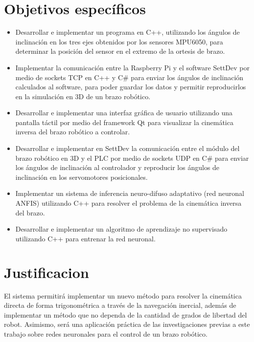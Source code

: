 \documentclass[12pt]{report}
\begin{document}
\section*{Objetivos específicos}
\begin{itemize}
	
\item Desarrollar e implementar un programa en C++, utilizando los ángulos de inclinación en los tres ejes obtenidos por los sensores MPU6050, para determinar la posición del sensor en el extremo de la ortesis de brazo.

\item Implementar la comunicación entre la Raspberry Pi y el software SettDev por medio de sockets TCP en C++ y C\# para enviar los ángulos de inclinación calculados al software, para poder guardar los datos y permitir reproducirlos en la simulación en 3D de un brazo robótico.

\item Desarrollar e implementar una interfaz gráfica de usuario utilizando una pantalla táctil por medio del framework Qt para visualizar la cinemática inversa del brazo robótico a controlar.

\item Desarrollar e implementar en SettDev la comunicación entre el módulo del brazo robótico en 3D y el PLC por medio de sockets UDP en C\# para enviar los ángulos de inclinación al controlador y reproducir los ángulos de inclinación en los servomotores posicionales.

\item Implementar un sistema de inferencia neuro-difuso adaptativo (red neuronal ANFIS) utilizando C++ para resolver el problema de la cinemática inversa del brazo.

\item Desarrollar e implementar un algoritmo de aprendizaje no supervisado utilizando C++ para entrenar la red neuronal.

\end{itemize}
\newpage
\section*{Justificacion}

El sistema permitirá implementar un nuevo método para resolver la cinemática directa de forma trigonométrica a través de la navegación inercial, además de implementar un método que no dependa de la cantidad de grados de libertad del robot. Asimismo, será una aplicación práctica de las investigaciones previas a este trabajo sobre redes neuronales para el control de un brazo robótico.
\end{document}
